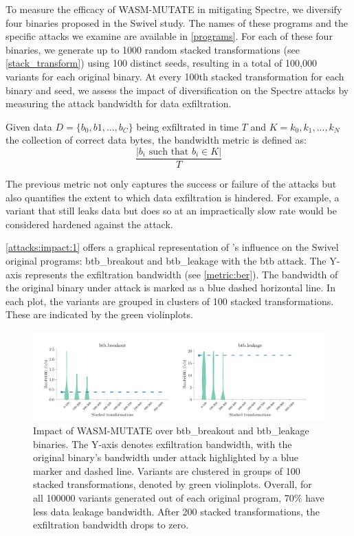 To measure the efficacy of WASM-MUTATE in mitigating Spectre, we diversify four \Wasm binaries proposed in the Swivel study. 
The names of these programs and the specific attacks we examine are available in \autoref{programs}. 
For each of these four binaries, we generate up to 1000 random stacked transformations (see \autoref{stack_transform}) using 100 distinct seeds, resulting in a total of 100,000 variants for each original binary. 
At every 100th stacked transformation for each binary and seed, we assess the impact of diversification on the Spectre attacks by measuring the attack bandwidth for data exfiltration. 

\begin{definition}\label{metric:ber}
    Given data $D=\{b_0, b1, ..., b_C\}$ being exfiltrated in time $T$ and $K = {k_0, k_1, ..., k_N}$ the collection of correct data bytes, the bandwidth metric is defined as:
    $$
        \frac{|b_i\text{ such that } b_i \in K|}{T}
    $$
\end{definition}

The previous metric not only captures the success or failure of the attacks but also quantifies the extent to which data exfiltration is hindered. 
For example, a variant that still leaks data but does so at an impractically slow rate would be considered hardened against the attack.



\autoref{attacks:impact:1} offers a graphical representation of \tool's influence on the Swivel original programs: btb\_breakout and btb\_leakage with the btb attack. 
The Y-axis represents the exfiltration bandwidth (see \autoref{metric:ber}). 
The bandwidth of the original binary under attack is marked as a blue dashed horizontal line.
In each plot, the variants are grouped in clusters of 100 stacked transformations. 
These are indicated by the green violinplots.

\begin{figure}[h]
    \centering
    \includegraphics[width=\linewidth]{plots/spectre/results.rq3.1.pdf}
    \caption{Impact of WASM-MUTATE over btb\_breakout and btb\_leakage binaries. The Y-axis denotes exfiltration bandwidth, with the original binary's bandwidth under attack highlighted by a blue marker and dashed line. Variants are clustered in groups of 100 stacked transformations, denoted by green violinplots. 
    Overall, for all 100000 variants generated out of each original program, 70\% have less data leakage bandwidth.
    After 200 stacked transformations, the exfiltration bandwidth drops to zero.
    }
  \label{attacks:impact:1}
\end{figure}

